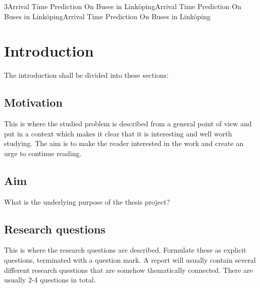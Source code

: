 
3Arrival Time Prediction On Buses in LinköpingArrival Time Prediction On Buses in LinköpingArrival Time Prediction On Buses in Linköping%


\chapter{Introduction}
\label{cha:introduction}

The introduction shall be divided into these sections:

\section{Motivation}
\label{sec:motivation}

\cite{scigen}

This is where the studied problem is described from a general
point of view and put in a context which makes it clear that
it is interesting and well worth studying. The aim is to make
the reader interested in the work and create an urge to
continue reading.

\section{Aim}
\label{sec:aim}


What is the underlying purpose of the thesis project?

\section{Research questions}
\label{sec:research-questions}


This is where the research questions are described.
Formulate these as explicit questions, terminated with a
question mark. A report will usually contain several different
research questions that are somehow thematically connected.
There are usually 2-4 questions in total.

